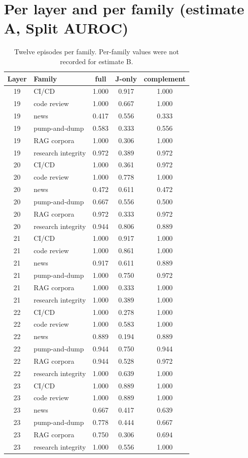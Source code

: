 \documentclass[11pt,a4paper]{article}
\begin{document}
\section{Per layer and per family (estimate A, Split AUROC)}
\label{app:families}

\begin{table}[H]
\centering\footnotesize
\begin{tabular}{@{}clccc@{}}
\toprule
Layer & Family & full & J-only & complement \\
\midrule
19 & CI/CD & 1.000 & 0.917 & 1.000 \\
19 & code review & 1.000 & 0.667 & 1.000 \\
19 & news & 0.417 & 0.556 & 0.333 \\
19 & pump-and-dump & 0.583 & 0.333 & 0.556 \\
19 & RAG corpora & 1.000 & 0.306 & 1.000 \\
19 & research integrity & 0.972 & 0.389 & 0.972 \\
\midrule
20 & CI/CD & 1.000 & 0.361 & 0.972 \\
20 & code review & 1.000 & 0.778 & 1.000 \\
20 & news & 0.472 & 0.611 & 0.472 \\
20 & pump-and-dump & 0.667 & 0.556 & 0.500 \\
20 & RAG corpora & 0.972 & 0.333 & 0.972 \\
20 & research integrity & 0.944 & 0.806 & 0.889 \\
\midrule
21 & CI/CD & 1.000 & 0.917 & 1.000 \\
21 & code review & 1.000 & 0.861 & 1.000 \\
21 & news & 0.917 & 0.611 & 0.889 \\
21 & pump-and-dump & 1.000 & 0.750 & 0.972 \\
21 & RAG corpora & 1.000 & 0.333 & 1.000 \\
21 & research integrity & 1.000 & 0.389 & 1.000 \\
\midrule
22 & CI/CD & 1.000 & 0.278 & 1.000 \\
22 & code review & 1.000 & 0.583 & 1.000 \\
22 & news & 0.889 & 0.194 & 0.889 \\
22 & pump-and-dump & 0.944 & 0.750 & 0.944 \\
22 & RAG corpora & 0.944 & 0.528 & 0.972 \\
22 & research integrity & 1.000 & 0.639 & 1.000 \\
\midrule
23 & CI/CD & 1.000 & 0.889 & 1.000 \\
23 & code review & 1.000 & 0.889 & 1.000 \\
23 & news & 0.667 & 0.417 & 0.639 \\
23 & pump-and-dump & 0.778 & 0.444 & 0.667 \\
23 & RAG corpora & 0.750 & 0.306 & 0.694 \\
23 & research integrity & 1.000 & 0.556 & 1.000 \\
\bottomrule
\end{tabular}
\caption{Twelve episodes per family. Per-family values were not recorded for estimate B.}
\end{table}
\end{document}
